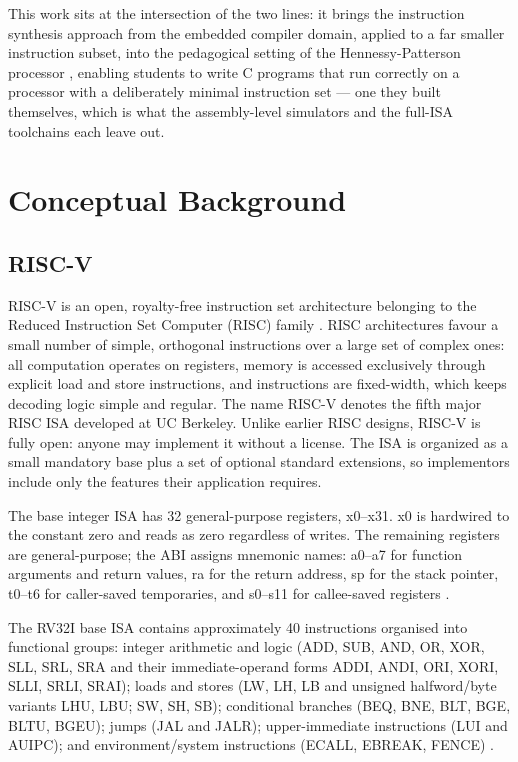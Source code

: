 This work sits at the intersection of the two lines: it brings the instruction synthesis approach
from the embedded compiler domain, applied to a far smaller instruction subset,
into the pedagogical setting of the Hennessy-Patterson processor \cite{patterson2020},
enabling students to write C programs that run correctly on a processor with a deliberately minimal
instruction set --- one they built themselves, which is what the assembly-level simulators and the
full-ISA toolchains each leave out.


\chapter{Conceptual Background} \label{cap:background}

\section{RISC-V}

RISC-V is an open, royalty-free instruction set architecture belonging to the Reduced Instruction Set
Computer (RISC) family \cite{riscv-spec}. RISC architectures favour a small number of simple,
orthogonal instructions over a large set of complex ones: all computation operates on registers, memory
is accessed exclusively through explicit load and store instructions, and instructions are fixed-width,
which keeps decoding logic simple and regular. The name RISC-V denotes the fifth major RISC ISA
developed at UC Berkeley. Unlike earlier RISC designs, RISC-V is fully open: anyone may implement it
without a license. The ISA is organized as a small mandatory base plus a set of optional standard
extensions, so implementors include only the features their application requires.

The base integer ISA has 32 general-purpose registers, x0--x31. x0 is hardwired to the constant zero
and reads as zero regardless of writes. The remaining registers are general-purpose; the ABI assigns
mnemonic names: a0--a7 for function arguments and return values, ra for the return address, sp for the
stack pointer, t0--t6 for caller-saved temporaries, and s0--s11 for callee-saved registers
\cite{riscv-spec}.

The RV32I base ISA contains approximately 40 instructions organised into functional groups: integer
arithmetic and logic (ADD, SUB, AND, OR, XOR, SLL, SRL, SRA and their immediate-operand forms ADDI,
ANDI, ORI, XORI, SLLI, SRLI, SRAI); loads and stores (LW, LH, LB and unsigned halfword/byte variants
LHU, LBU; SW, SH, SB); conditional branches (BEQ, BNE, BLT, BGE, BLTU, BGEU); jumps (JAL and JALR);
upper-immediate instructions (LUI and AUIPC); and environment/system instructions (ECALL, EBREAK,
FENCE) \cite{riscv-spec}.

